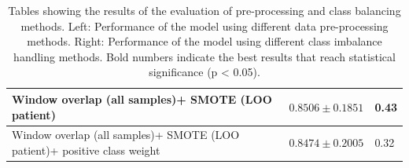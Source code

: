 \documentclass[a4paper,fleqn]{cas-sc}
\begin{document}
\begin{table}[h]
\begin{minipage}{0.47\linewidth}
\begin{tabular}{|p{1.7in}|p{0.5in}|p{0.42in}|}
    \hline
    Window overlap (all samples)\newline + SMOTE (LOO patient) & $0.8506 \pm 0.1851$ & 0.43\\
    \hline
    Window overlap (all samples)\newline + SMOTE (LOO patient)\newline + positive class weight & $0.8474 \pm 0.2005$ & 0.32 \\
    \hline
    \end{tabular}
   \label{tab:class-balancing-results}
\end{minipage}
\addtocounter{table}{-2}
\captionsetup{labelformat=twotable}
\caption{Tables showing the results of the evaluation of pre-processing and class balancing methods. Left: Performance of the model using different data pre-processing methods. Right: Performance of the model using different class imbalance handling methods. Bold numbers indicate the best results that reach statistical significance (p < 0.05).}
\addtocounter{table}{1}
\end{table}


\end{document}
